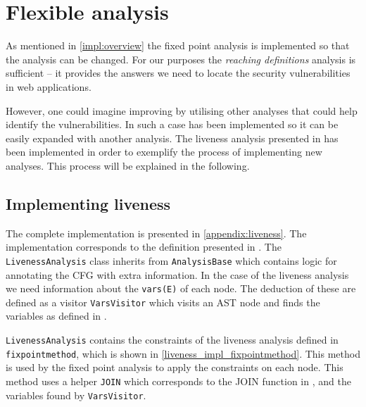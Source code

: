 \section{Flexible analysis}\label{impl:flexible}
As mentioned in \cref{impl:overview} the fixed point analysis is implemented so that the analysis can be changed.
For our purposes the \emph{reaching definitions} analysis is sufficient -- it provides the answers we need to locate the security vulnerabilities in web applications.

However, one could imagine improving \pyt{} by utilising other analyses that could help identify the vulnerabilities.
In such a case \pyt{} has been implemented so it can be easily expanded with another analysis.
The liveness analysis presented in \citet[p.~19]{schwartzbach} has been implemented in order to exemplify the process of implementing new analyses.
This process will be explained in the following.

\subsection{Implementing liveness}
The complete implementation is presented in \cref{appendix:liveness}.
The implementation corresponds to the definition presented in \citet[p.~20]{schwartzbach}.
The \texttt{LivenessAnalysis} class inherits from \texttt{AnalysisBase} which contains logic for annotating the CFG with extra information.
In the case of the liveness analysis we need information about the \texttt{vars(E)} of each node.
The deduction of these are defined as a visitor \texttt{VarsVisitor}  which visits an AST node and finds the variables as defined in \citet{schwartzbach}.

\texttt{LivenessAnalysis} contains the constraints of the liveness analysis defined in \texttt{fixpointmethod}, which is shown in \cref{liveness_impl_fixpointmethod}.
This method is used by the fixed point analysis to apply the constraints on each node.
This method uses a helper \texttt{JOIN} which corresponds to the JOIN function in \citet{schwartzbach}, and the variables found by \texttt{VarsVisitor}.


